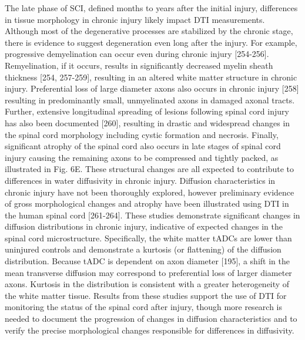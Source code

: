 The late phase of SCI, defined months to years after the initial injury, differences in tissue morphology in chronic injury likely impact DTI measurements.  Although most of the degenerative processes are stabilized by the chronic stage, there is evidence to suggest degeneration even long after the injury.  For example, progressive demyelination can occur even during chronic injury [254-256].  Remyelination, if it occurs, results in significantly decreased myelin sheath thickness [254, 257-259], resulting in an altered white matter structure in chronic injury.  Preferential loss of large diameter axons also occurs in chronic injury [258] resulting in predominantly small, unmyelinated axons in damaged axonal tracts.  Further, extensive longitudinal spreading of lesions following spinal cord injury has also been documented [260], resulting in drastic and widespread changes in the spinal cord morphology including cystic formation and necrosis.  Finally, significant atrophy of the spinal cord also occurs in late stages of spinal cord injury causing the remaining axons to be compressed and tightly packed, as illustrated in Fig. 6E. These structural changes are all expected to contribute to differences in water diffusivity in chronic injury.
Diffusion characteristics in chronic injury have not been thoroughly explored, however preliminary evidence of gross morphological changes and atrophy have been illustrated using DTI in the human spinal cord [261-264].  These studies demonstrate significant changes in diffusion distributions in chronic injury, indicative of expected changes in the spinal cord microstructure.  Specifically, the white matter tADCs are lower than uninjured controls and demonstrate a kurtosis (or flattening) of the diffusion distribution. Because tADC is dependent on axon diameter [195], a shift in the mean transverse diffusion may correspond to preferential loss of larger diameter axons.  Kurtosis in the distribution is consistent with a greater heterogeneity of the white matter tissue. Results from these studies support the use of DTI for monitoring the status of the spinal cord after injury, though more research is needed to document the progression of changes in diffusion characteristics and to verify the precise morphological changes responsible for differences in diffusivity. 


